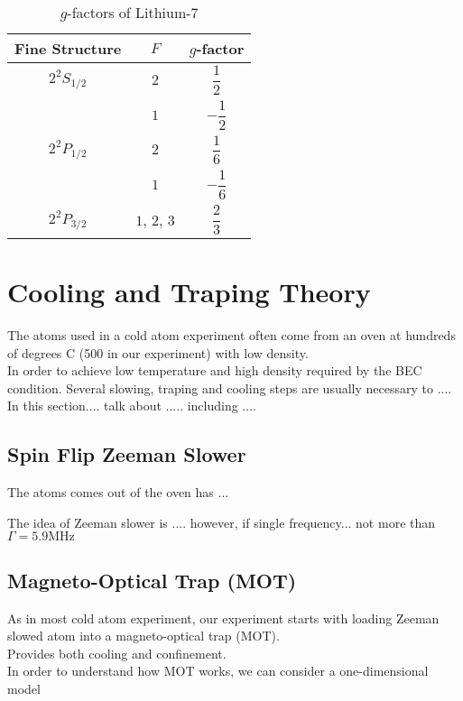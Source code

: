 \begin{table}
\caption{$g$-factors of Lithium-$7$}
\label{li7:g-factors}
\begin{center}
\begin{tabular}{|c|c|c|}\hline
Fine Structure & $F$ & $g$-factor \\\hline
$2^2S_{1/2}$ & $2$ & $\dfrac 12$ \\\cline{2-3}
 & $1$ & $-\dfrac 12$ \\\hline
$2^2P_{1/2}$ & $2$ & $\dfrac 16$ \\\cline{2-3}
 & $1$ & $-\dfrac 16$ \\\hline
$2^2P_{3/2}$ & $1$, $2$, $3$ & $\dfrac 23$ \\\hline
\end{tabular}
\end{center}
\end{table}


\section{Cooling and Traping Theory}
The atoms used in a cold atom experiment often come from an oven at hundreds of degrees C (500 in our experiment) with low density.\\
In order to achieve low temperature and high density required by the BEC condition. Several slowing, traping and cooling steps are usually necessary to ....\\
In this section.... talk about ..... including ....\\

\subsection{Spin Flip Zeeman Slower}\label{theory:zeeman}

The atoms comes out of the oven has ...\\

The idea of Zeeman slower is .... however, if single frequency... not more than $\Gamma=5.9\text{MHz}$


\subsection{Magneto-Optical Trap (MOT)}\label{theory:mot}

As in most cold atom experiment, our experiment starts with loading Zeeman slowed atom into a magneto-optical trap (MOT).\\
Provides both cooling and confinement.\\
In order to understand how MOT works, we can consider a one-dimensional model\\

